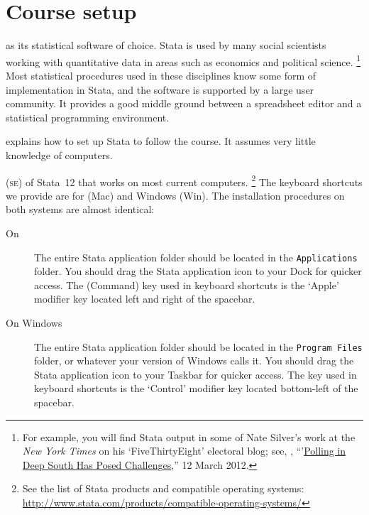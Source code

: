 %
%
\section{Course setup}%
	\label{sec:course-setup}%
	
	 as its statistical software of choice. Stata is used by many social scientists working with quantitative data in areas such as economics and political science.%
 	\footnote{For example, you will find Stata output in some of Nate Silver's work at the \emph{New York Times} on his `FiveThirtyEight' electoral blog; see, \eg, ``'\href{http://fivethirtyeight.blogs.nytimes.com/2012/03/12/polling-in-deep-south-has-posed-challenges/}{Polling in Deep South Has Posed Challenges},'' 12 March 2012.} %
	Most statistical procedures used in these disciplines know some form of implementation in Stata, and the software is supported by a large user community. It provides a good middle ground between a spreadsheet editor and a statistical programming environment.%
  	
	 explains how to set up Stata to follow the course. It assumes very little knowledge of computers. %

   (\textsc{se}) of Stata~12 that works on most current computers.%
  \footnote{See the list of Stata products and compatible operating systems: %
		\url{http://www.stata.com/products/compatible-operating-systems/}}%
		The keyboard shortcuts we provide are for \OSX (Mac) and Windows (Win). The installation procedures on both systems are almost identical:%
		
	\begin{description}

		\item[On \OSX] %
		The entire Stata application folder should be located in the \texttt{Applications} folder. You should drag the Stata application icon to your Dock for quicker access. The  (Command) key used in keyboard shortcuts is the `Apple' modifier key located left and right of the spacebar.%

		\item[On Windows] %
		The entire Stata application folder should be located in the \texttt{Program Files} folder, or whatever your version of Windows calls it. You should drag the Stata application icon to your Taskbar for quicker access. The  key used in keyboard shortcuts is the `Control' modifier key located bottom-left of the spacebar.%

	\end{description}

